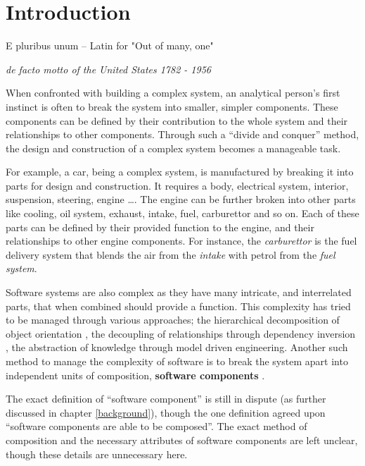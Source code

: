 \chapter{Introduction}
\label{introduction}
\epigraph{E pluribus unum -- Latin for "Out of many, one"}
{\textit{de facto motto of the United States 1782 - 1956}}

When confronted with building a complex system, an analytical person's first instinct is often to break the system into smaller, simpler components. 
These components can be defined by their contribution to the whole system and their relationships to other components.
Through such a ``divide and conquer'' method, the design and construction of a complex system becomes a manageable task.

For example, a car, being a complex system, is manufactured by breaking it into parts for design and construction.
It requires a body, electrical system, interior, suspension, steering, engine \ldots. 
The engine can be further broken into other parts like cooling, oil system, exhaust, intake, fuel, carburettor and so on.
Each of these parts can be defined by their provided function to the engine, and their relationships to other engine components.
For instance, the \textit{carburettor} is the fuel delivery system that blends the air from the \textit{intake} with petrol from the \textit{fuel system}.

Software systems are also complex as they have many intricate, and interrelated parts, that when combined should provide a function.
This complexity has tried to be managed through various approaches; the hierarchical decomposition of object orientation \citep{cox1986}, 
the decoupling of relationships through dependency inversion \citep{martin1996dependency}, the abstraction of knowledge through model driven engineering. 
Another such method to manage the complexity of software is to break the system apart into independent units of composition, \textbf{software components} \citep{Szyperski2002}. 

The exact definition of ``software component'' is still in dispute (as further discussed in chapter \ref{background}),
though the one definition agreed upon ``software components are able to be composed''.
The exact method of composition and the necessary attributes of software components are left unclear, though these details are unnecessary here.


